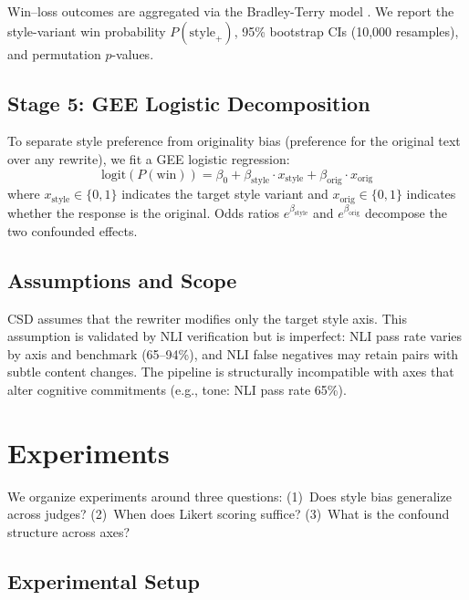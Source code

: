 \documentclass[11pt,a4paper]{article}
\begin{document}
Win--loss outcomes are aggregated via the Bradley-Terry model \citep{bt1952}. We report the style-variant win probability $P(\text{style}_+)$, 95\% bootstrap CIs (10,000 resamples), and permutation $p$-values.

\subsection{Stage 5: GEE Logistic Decomposition}

To separate style preference from originality bias (preference for the original text over any rewrite), we fit a GEE logistic regression:
\begin{equation}
    \text{logit}(P(\text{win})) = \beta_0 + \beta_{\text{style}} \cdot x_{\text{style}} + \beta_{\text{orig}} \cdot x_{\text{orig}}
\end{equation}
where $x_{\text{style}} \in \{0, 1\}$ indicates the target style variant and $x_{\text{orig}} \in \{0, 1\}$ indicates whether the response is the original. Odds ratios $e^{\beta_{\text{style}}}$ and $e^{\beta_{\text{orig}}}$ decompose the two confounded effects.

\subsection{Assumptions and Scope}

CSD assumes that the rewriter modifies only the target style axis. This assumption is validated by NLI verification but is imperfect: NLI pass rate varies by axis and benchmark (65--94\%), and NLI false negatives may retain pairs with subtle content changes. The pipeline is structurally incompatible with axes that alter cognitive commitments (e.g., tone: NLI pass rate 65\%).

\section{Experiments}

We organize experiments around three questions: (1)~Does style bias generalize across judges? (2)~When does Likert scoring suffice? (3)~What is the confound structure across axes?

\subsection{Experimental Setup}
\end{document}
